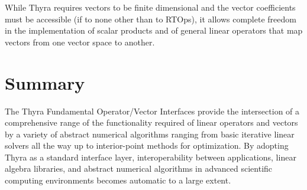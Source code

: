 \documentclass[11pt]{SANDreport}
\begin{document}
While Thyra requires vectors to be finite dimensional and the vector coefficients must be accessible (if to none other than to RTOps), it allows complete freedom in the implementation of scalar products and of general linear operators that map vectors from one vector space to another.


%
\section{Summary}
%

The Thyra Fundamental Operator/Vector Interfaces provide the intersection of a comprehensive range of the functionality required of linear operators and vectors by a variety of abstract numerical algorithms ranging from basic iterative linear solvers all the way up to interior-point methods for optimization.  By adopting Thyra as a standard interface layer, interoperability between applications, linear algebra libraries, and abstract numerical algorithms in advanced scientific computing environments becomes automatic to a large extent.

%
\clearpage
\providecommand*{\phantomsection}{}
\phantomsection
{}



%

%


%

\begin{SANDdistribution}[NM]
\end{SANDdistribution}
\end{document}
